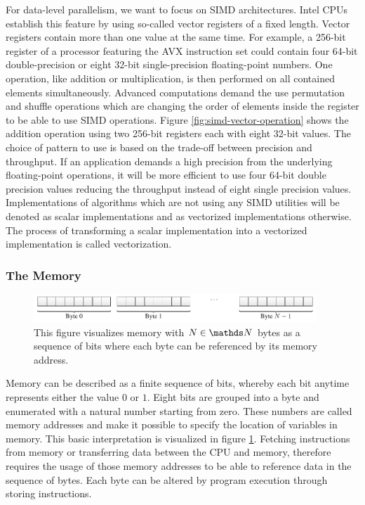 \documentclass{stdlocal}
\begin{document}
    For data-level parallelism, we want to focus on SIMD architectures.
    Intel CPUs establish this feature by using so-called vector registers of a fixed length.
    Vector registers contain more than one value at the same time.
    For example, a 256-bit register of a processor featuring the AVX instruction set could contain four 64-bit double-precision or eight 32-bit single-precision floating-point numbers.
    One operation, like addition or multiplication, is then performed on all contained elements simultaneously.
    Advanced computations demand the use permutation and shuffle operations which are changing the order of elements inside the register to be able to use SIMD operations.
    Figure \ref{fig:simd-vector-operation} shows the addition operation using two 256-bit registers each with eight 32-bit values.
    The choice of pattern to use is based on the trade-off between precision and throughput.
    If an application demands a high precision from the underlying floating-point operations, it will be more efficient to use four 64-bit double precision values reducing the throughput instead of eight single precision values.
    Implementations of algorithms which are not using any SIMD utilities will be denoted as scalar implementations and as vectorized implementations otherwise.
    The process of transforming a scalar implementation into a vectorized implementation is called vectorization.
    \autocite{intel-optimization-reference,fog2019a,fog2019d,dolbeau2016}

    \subsubsection*{The Memory}

    \begin{figure}
      \center
      \includegraphics[width=0.95\textwidth]{figures/memory.pdf}
      \caption[Memory Structure]{%
        This figure visualizes memory with $N\in\setNatural$ bytes as a sequence of bits where each byte can be referenced by its memory address.%
      }
      \label{fig:memory}
    \end{figure}

    Memory can be described as a finite sequence of bits, whereby each bit anytime represents either the value $0$ or $1$.
    Eight bits are grouped into a byte and enumerated with a natural number starting from zero.
    These numbers are called memory addresses and make it possible to specify the location of variables in memory.
    This basic interpretation is visualized in figure \ref{fig:memory}.
    Fetching instructions from memory or transferring data between the CPU and memory, therefore requires the usage of those memory addresses to be able to reference data in the sequence of bytes.
    Each byte can be altered by program execution through storing instructions.
    \autocite{patterson2014}
\end{document}
